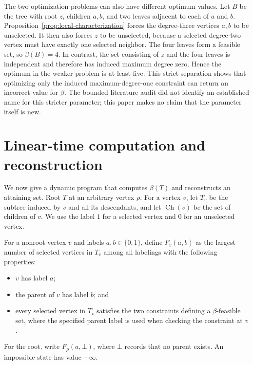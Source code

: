 \documentclass[11pt,a4paper]{article}
\providecommand{\tightlist}{%
  \setlength{\itemsep}{0pt}\setlength{\parskip}{0pt}}
\numberwithin{equation}{section}
\begin{document}
The two optimization problems can also have different optimum values.
Let \(B\) be the tree with root \(z\), children \(a,b\), and two leaves
adjacent to each of \(a\) and \(b\). Proposition~\ref{prop:local-characterization}
forces the degree-three vertices \(a,b\) to be unselected. It then also
forces \(z\) to be unselected, because a selected degree-two vertex must have
exactly one selected neighbor. The four leaves form a feasible set, so
\(\beta(B)=4\). In contrast, the set consisting of \(z\) and the four leaves
is independent and therefore has induced maximum degree zero. Hence the
optimum in the weaker problem is at least five. This strict separation shows
that optimizing only the induced maximum-degree-one constraint can return an
incorrect value for \(\beta\). The
bounded literature audit did not identify an established name for this
stricter parameter; this paper makes no claim that the parameter itself
is new.

\section{Linear-time computation and reconstruction}\label{sec:algorithm}

We now give a dynamic program that computes \(\beta(T)\) and
reconstructs an attaining set. Root \(T\) at an arbitrary vertex
\(\rho\). For a vertex \(v\), let \(T_v\) be the subtree induced by
\(v\) and all its descendants, and let \(\operatorname{Ch}(v)\) be the
set of children of \(v\). We use the label \(1\) for a selected vertex
and \(0\) for an unselected vertex.

For a nonroot vertex \(v\) and labels \(a,b\in\{0,1\}\), define
\(F_v(a,b)\) as the largest number of selected vertices in \(T_v\) among
all labelings with the following properties:

\begin{itemize}
\tightlist
\item
  \(v\) has label \(a\);
\item
  the parent of \(v\) has label \(b\); and
\item
  every selected vertex in \(T_v\) satisfies the two constraints
  defining a \(\beta\)-feasible set, where the specified parent label is
  used when checking the constraint at \(v\).
\end{itemize}

For the root, write \(F_\rho(a,\bot)\), where \(\bot\) records that no
parent exists. An impossible state has value \(-\infty\).
\end{document}
